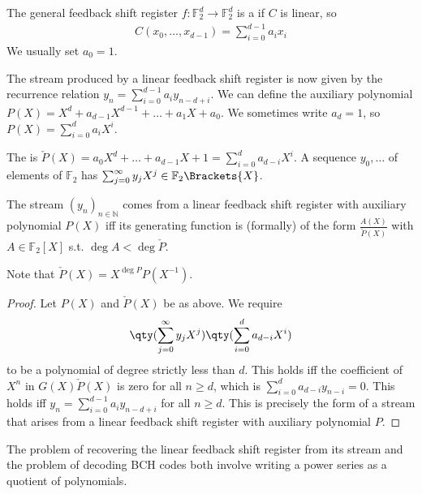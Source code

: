 \begin{definition}
    The general feedback shift register $f \colon \mathbb F_2^d \to \mathbb F_2^d$ is a  if $C$ is linear, so
    \begin{align*}
        C(x_0, \dots, x_{d-1}) = \sum_{i=0}^{d-1} a_i x_i
    \end{align*}
    We usually set $a_0 = 1$.
\end{definition}

The stream produced by a linear feedback shift register is now given by the recurrence relation $y_n = \sum_{i=0}^{d-1} a_i y_{n-d+i}$.
We can define the auxiliary polynomial $P(X) = X^d + a_{d-1} X^{d-1} + \dots + a_1 X + a_0$.
We sometimes write $a_d = 1$, so $P(X) = \sum_{i=0}^d a_i X^i$.

\begin{definition}
    The  is $\check{P}(X) = a_0 X^d + \dots + a_{d-1} X + 1 = \sum_{i=0}^d a_{d-i} X^i$.
    A sequence $y_0, \dots$ of elements of $\mathbb F_2$ has  $\sum_{j=0}^\infty y_j X^j \in \mathbb F_2\Brackets{X}$.
\end{definition}

\begin{theorem}
    The stream $(y_n)_{n \in \mathbb N}$ comes from a linear feedback shift register with auxiliary polynomial $P(X)$ iff its generating function is (formally) of the form $\frac{A(X)}{\check{P}(X)}$ with $A \in \mathbb F_2[X]$ s.t. $\deg A < \deg \check{P}$.
\end{theorem}

Note that $\check{P}(X) = X^{\deg P}P(X^{-1})$.

\begin{proof}
    Let $P(X)$ and $\check{P}(X)$ be as above.
    We require
    \begin{align*}
        \qty(\sum_{j=0}^\infty y_j X^j) \qty(\sum_{i=0}^d a_{d-i} X^i)
    \end{align*}
    to be a polynomial of degree strictly less than $d$.
    This holds iff the coefficient of $X^n$ in $G(X) \check{P}(X)$ is zero for all $n \geq d$, which is $\sum_{i=0}^d a_{d-i} y_{n-i} = 0$.
    This holds iff $y_n = \sum_{i=0}^{d-1} a_i y_{n-d + i}$ for all $n \geq d$.
    This is precisely the form of a stream that arises from a linear feedback shift register with auxiliary polynomial $P$.
\end{proof}

The problem of recovering the linear feedback shift register from its stream and the problem of decoding BCH codes both involve writing a power series as a quotient of polynomials.

